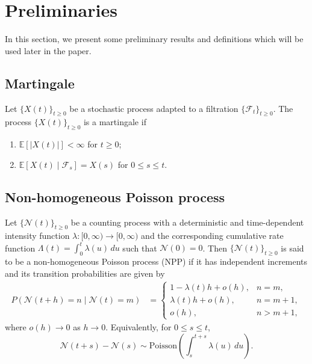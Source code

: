 \documentclass[11pt,oneside,reqno]{amsart}
\theoremstyle{definition}
\theoremstyle{remarkstyle}
\begin{document}
\section{Preliminaries}\label{sec 2} In this section, we present some preliminary results and definitions which will be used later in the paper.
\subsection{Martingale}\label{def:martingale}
Let $\{X(t)\}_{t \ge 0}$ be a stochastic process adapted to a filtration $\{\mathcal{F}_t\}_{t \ge 0}$. 
The process $\{X(t)\}_{t\ge 0}$ is a martingale if
\begin{enumerate}
    \item $\mathbb{E}[|X(t)|] < \infty$ for $t \ge 0$;
    \item $\mathbb{E}[X(t) \mid \mathcal{F}_s] = X(s)$ for $0 \le s \le t$.
\end{enumerate}
\subsection{Non-homogeneous Poisson process}\label{def:nhpp}
Let $\{\mathcal{N}(t)\}_{t\geq 0}$ be a counting process with a deterministic and time-dependent intensity function 
$\lambda:[0,\infty)\to [0,\infty)$ and the corresponding cumulative rate function 
$\Lambda(t)=\int_{0}^{t}\lambda(u)\,du$ such that $\mathcal{N}(0)=0$. 
Then $\{\mathcal{N}(t)\}_{t\geq 0}$ is said to be a non-homogeneous Poisson process (NPP) if it has independent increments and its transition probabilities are given by
\begin{align*}
P(\mathcal{N}(t+h)=n\mid \mathcal{N}(t)=m) &=
\begin{cases}
1 - \lambda(t)h + o(h), & n=m, \\
\lambda(t)h + o(h), & n=m+1, \\
o(h), & n>m+1,
\end{cases}
\end{align*}
    where $o(h)\rightarrow 0$ as $h\rightarrow 0$.    
Equivalently, for $0 \le s \le t$, 
\begin{equation*}
\mathcal{N}(t+s) - \mathcal{N}(s) \sim \mathrm{Poisson}\!\left( \int_{s}^{t+s} \lambda(u)\,du \right).
\end{equation*}
\end{document}
